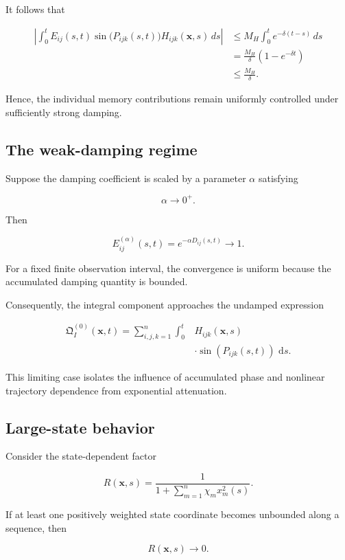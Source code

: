 \documentclass[12pt]{article}
\numberwithin{equation}{section}
\newcommand{\Q}{\mathfrak{Q}}
\newcommand{\dd}{\,\mathrm{d}}
\theoremstyle{definition}
\theoremstyle{remark}
\begin{document}
It follows that

\[
\begin{aligned}
\left|
\int_0^t
E_{ij}(s,t)
\sin\bigl(P_{ijk}(s,t)\bigr)
H_{ijk}(\mathbf{x},s)
\,ds
\right|
&\leq
M_H\int_0^t e^{-\delta(t-s)}\,ds
\\[6pt]
&=
\frac{M_H}{\delta}
\left(1-e^{-\delta t}\right)
\\[6pt]
&\leq
\frac{M_H}{\delta}.
\end{aligned}
\]

Hence, the individual memory contributions
remain uniformly controlled under sufficiently
strong damping.

\subsection{The weak-damping regime}

Suppose the damping coefficient is scaled
by a parameter \(\alpha\) satisfying

\[
\alpha\to0^+.
\]

Then

\[
E_{ij}^{(\alpha)}(s,t)
=
e^{-\alpha D_{ij}(s,t)}
\longrightarrow1.
\]

For a fixed finite observation interval,
the convergence is uniform because the
accumulated damping quantity is bounded.

Consequently, the integral component
approaches the undamped expression

\[
\begin{aligned}
\Q_I^{(0)}(\mathbf{x},t)
=
\sum_{i,j,k=1}^{n}
\int_0^t
&H_{ijk}(\mathbf{x},s)
\\
&\cdot
\sin(P_{ijk}(s,t))
\,\dd s.
\end{aligned}
\]

This limiting case isolates the influence
of accumulated phase and nonlinear trajectory
dependence from exponential attenuation.

\subsection{Large-state behavior}

Consider the state-dependent factor

\[
R(\mathbf{x},s)
=
\frac{1}
{1+\sum_{m=1}^{n}\chi_mx_m^2(s)}.
\]

If at least one positively weighted
state coordinate becomes unbounded along
a sequence, then

\[
R(\mathbf{x},s)\to0.
\]
\end{document}
